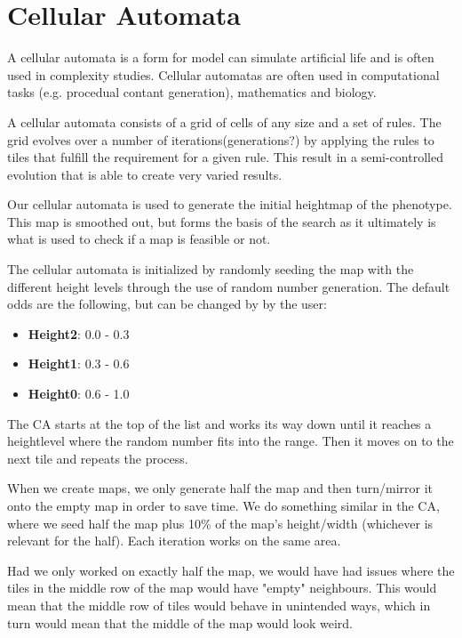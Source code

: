 \section{Cellular Automata}
\label{CellularAutomata}

A cellular automata is a form for model can simulate artificial life and is often used in complexity studies. Cellular automatas are often used in computational tasks (e.g. procedual contant generation), mathematics and biology.

A cellular automata consists of a grid of cells of any size and a set of rules. The grid evolves over a number of iterations(generations?) by applying the rules to tiles that fulfill the requirement for a given rule. This result in a semi-controlled evolution that is able to create very varied results.

Our cellular automata is used to generate the initial heightmap of the phenotype. This map is smoothed out, but forms the basis of the search as it ultimately is what is used to check if a map is feasible or not.

The cellular automata is initialized by randomly seeding the map with the different height levels through the use of random number generation. The default odds are the following, but can be changed by by the user:
\begin{itemize}

	\item \textbf{Height2}: 0.0 - 0.3

	\item \textbf{Height1}: 0.3 - 0.6

	\item \textbf{Height0}: 0.6 - 1.0

\end{itemize}

The CA starts at the top of the list and works its way down until it reaches a heightlevel where the random number fits into the range. Then it moves on to the next tile and repeats the process.

When we create maps, we only generate half the map and then turn/mirror it onto the empty map in order to save time. We do something similar in the CA, where we seed half the map plus 10\% of the map's height/width (whichever is relevant for the half). Each iteration works on the same area.

Had we only worked on exactly half the map, we would have had issues where the tiles in the middle row of the map would have "empty" neighbours. This would mean that the middle row of tiles would behave in unintended ways, which in turn would mean that the middle of the map would look weird.
